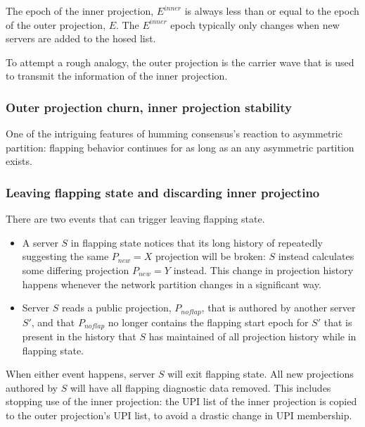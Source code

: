 \documentclass[preprint,10pt]{sigplanconf}
\begin{document}
The epoch of the inner projection, $E^{inner}$ is always less than or
equal to the epoch of the outer projection, $E$.  The $E^{inner}$
epoch typically only changes when new servers are added to the hosed
list.

To attempt a rough analogy, the outer projection is the carrier wave
that is used to transmit the information of the inner projection.

\subsubsection{Outer projection churn, inner projection stability}

One of the intriguing features of humming consensus's reaction to
asymmetric partition: flapping behavior continues for as long as
an any asymmetric partition exists.

\subsubsection{Leaving flapping state and discarding inner projectino}

There are two events that can trigger leaving flapping state.

\begin{itemize}

\item A server $S$ in flapping state notices that its long history of
  repeatedly suggesting the same $P_{new}=X$ projection will be broken:
  $S$ instead calculates some differing projection $P_{new} = Y$ instead.
  This change in projection history happens whenever the network
  partition changes in a significant way.

\item Server $S$ reads a public projection, $P_{noflap}$, that is
  authored by another server $S'$, and that $P_{noflap}$ no longer
  contains the flapping start epoch for $S'$ that is present in the
  history that $S$ has maintained of all projection history while in
  flapping state.

\end{itemize}

When either event happens, server $S$ will exit flapping state.  All
new projections authored by $S$ will have all flapping diagnostic data
removed.  This includes stopping use of the inner projection: the UPI
list of the inner projection is copied to the outer projection's UPI
list, to avoid a drastic change in UPI membership.
\end{document}
